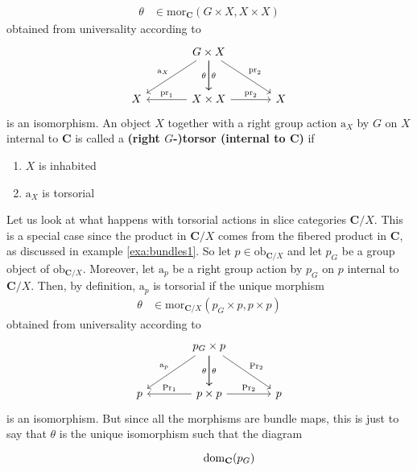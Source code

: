 \begin{exa}
\begin{enumerate}
\begin{align*}
  \theta
  &\in
  \mathrm{mor}_{\mathbf{C}}
  \left(
    G
    \times
    X,
    X
    \times
    X
  \right)
\end{align*}
obtained from universality according to
\[
\begin{tikzcd}[sep=large]
  &
  G
  \times
  X
  \arrow{dr}{\mathrm{pr}_{2}}
  \arrow{d}{\theta}
  \arrow[swap]{d}{\theta}
  \arrow[swap]{dl}{\mathrm{a}_{X}}
  &
  \\
  X
  &
  X
  \times
  X
  \arrow{r}{\mathrm{pr}_{2}}
  \arrow[swap]{l}{\mathrm{pr}_{1}}
  &
  X
\end{tikzcd}
\]
is an isomorphism.
An object $X$ together with a right group action $\mathrm{a}_{X}$ by $G$ on $X$ internal to $\mathbf{C}$ is called a \textbf{(right $G$-)torsor (internal to $\mathbf{C}$)} if
\begin{enumerate}
\item[(Tor1)]
$X$ is inhabited
\item[(Tor2)]
$\mathrm{a}_{X}$ is torsorial
\end{enumerate}
Let us look at what happens with torsorial actions in slice categories $\mathbf{C} \slash X$.
This is a special case since the product in $\mathbf{C} \slash X$ comes from the fibered product in $\mathbf{C}$, as discussed in example \ref{exa:bundles1}.
So let $p \in \mathrm{ob}_{\mathbf{C} \slash X}$ and let $p_{G}$ be a group object of $\mathrm{ob}_{\mathbf{C} \slash X}$.
Moreover, let $\mathrm{a}_{p}$ be a right group action by $p_{G}$ on $p$ internal to $\mathbf{C} \slash X$.
Then, by definition, $\mathrm{a}_{p}$ is torsorial if the unique morphism
\begin{align*}
  \theta
  &\in
  \mathrm{mor}_{\mathbf{C} \slash X}
  \left(
    p_{G}
    \times
    p,
    p
    \times
    p
  \right)
\end{align*}
obtained from universality according to
\[
\begin{tikzcd}[sep=large]
  &
  p_{G}
  \times
  p
  \arrow{dr}{\mathrm{Pr}_{2}}
  \arrow{d}{\theta}
  \arrow[swap]{d}{\theta}
  \arrow[swap]{dl}{\mathrm{a}_{p}}
  &
  \\
  p
  &
  p
  \times
  p
  \arrow{r}{\mathrm{Pr}_{2}}
  \arrow[swap]{l}{\mathrm{Pr}_{1}}
  &
  p
\end{tikzcd}
\]
is an isomorphism.
But since all the morphisms are bundle maps, this is just to say that $\theta$ is the unique isomorphism such that the diagram
\[
\begin{tikzcd}[sep=large]
  &
  \mathrm{dom}_{\mathbf{C}}(p_{G})

\end{tikzcd}\]
\end{enumerate}
\end{exa}
